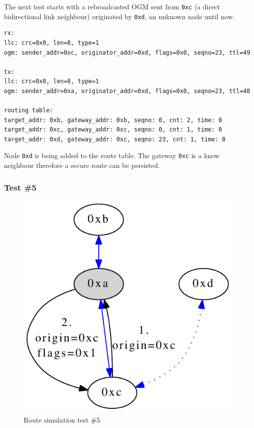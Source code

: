 The next test starts with a rebroadcasted OGM sent from \texttt{0xc} (a direct bidirectional link neighbour) originated by \texttt{0xd}, an unknown node until now.

\begin{lstlisting}[label=sim:test1,caption=Output of Test \#4]
rx:
llc: crc=0x0, len=8, type=1
ogm: sender_addr=0xc, originator_addr=0xd, flags=0x0, seqno=23, ttl=49

tx:
llc: crc=0x0, len=8, type=1
ogm: sender_addr=0xa, originator_addr=0xd, flags=0x0, seqno=23, ttl=48

routing table: 
target_addr: 0xb, gateway_addr: 0xb, seqno: 0, cnt: 2, time: 0
target_addr: 0xc, gateway_addr: 0xc, seqno: 0, cnt: 1, time: 0
target_addr: 0xd, gateway_addr: 0xc, seqno: 23, cnt: 1, time: 0
\end{lstlisting}

Node \texttt{0xd} is being added to the route table. The gateway \texttt{0xc} is a know neighbour therefore a secure route can be persisted.

\subsubsection{Test \#5}%
\begin{figure}[H]
  \begin{center}
    \includegraphics[]{figures/test5}
  \end{center}
  \caption{Route simulation test \#5}
\end{figure}

